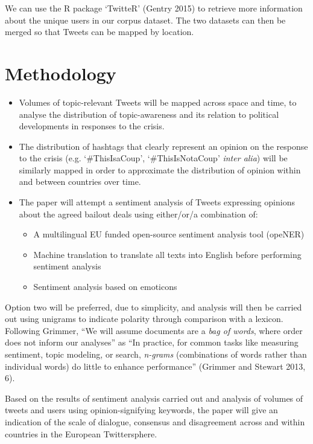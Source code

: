 \documentclass[]{article}
\begin{document}
We can use the R package `TwitteR' (Gentry 2015) to retrieve more
information about the unique users in our corpus dataset. The two
datasets can then be merged so that Tweets can be mapped by location.

\section{Methodology}\label{methodology}

\begin{itemize}
\item
  Volumes of topic-relevant Tweets will be mapped across space and time,
  to analyse the distribution of topic-awareness and its relation to
  political developments in responses to the crisis.
\item
  The distribution of hashtags that clearly represent an opinion on the
  response to the crisis (e.g. `\#ThisIsaCoup', `\#ThisIsNotaCoup'
  \emph{inter alia}) will be similarly mapped in order to approximate
  the distribution of opinion within and between countries over time.
\item
  The paper will attempt a sentiment analysis of Tweets expressing
  opinions about the agreed bailout deals using either/or/a combination
  of:

  \begin{itemize}
  \item
    A multilingual EU funded open-source sentiment analysis tool
    (opeNER)
  \item
    Machine translation to translate all texts into English before
    performing sentiment analysis
  \item
    Sentiment analysis based on emoticons
  \end{itemize}
\end{itemize}

Option two will be preferred, due to simplicity, and analysis will then
be carried out using unigrams to indicate polarity through comparison
with a lexicon. Following Grimmer, ``We will assume documents are a
\emph{bag of words}, where order does not inform our analyses'' as ``In
practice, for common tasks like measuring sentiment, topic modeling, or
search, \emph{n-grams} (combinations of words rather than individual
words) do little to enhance performance'' (Grimmer and Stewart 2013, 6).

Based on the results of sentiment analysis carried out and analysis of
volumes of tweets and users using opinion-signifying keywords, the paper
will give an indication of the scale of dialogue, consensus and
disagreement across and within countries in the European Twittersphere.
\end{document}

